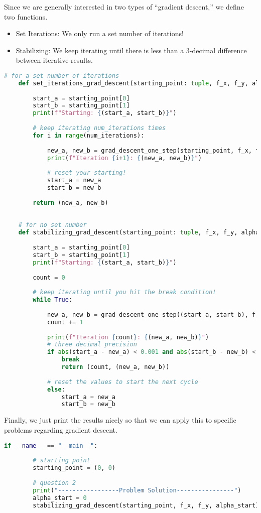 Since we are generally interested in two types of ``gradient descent,'' we define two functions. 
\begin{itemize}
    \item Set Iterations: We only run a set number of iterations!
    \item Stabilizing: We keep iterating until there is less than a $3$-decimal difference between iterative results.
\end{itemize}

\begin{lstlisting}[language=Python]
    # for a set number of iterations
    def set_iterations_grad_descent(starting_point: tuple, f_x, f_y, alpha: float, num_iterations: int):
    
        start_a = starting_point[0]
        start_b = starting_point[1]
        print(f"Starting: {(start_a, start_b)}")
    
        # keep iterating num_iterations times
        for i in range(num_iterations):
            
            new_a, new_b = grad_descent_one_step(starting_point, f_x, f_y, alpha)
            print(f"Iteration {i+1}: {(new_a, new_b)}")
    
            # reset your starting!
            start_a = new_a
            start_b = new_b
    
        return (new_a, new_b)
    
    
    # for no set number
    def stabilizing_grad_descent(starting_point: tuple, f_x, f_y, alpha: float):
    
        start_a = starting_point[0]
        start_b = starting_point[1]
        print(f"Starting: {(start_a, start_b)}")
    
        count = 0
    
        # keep iterating until you hit the break condition!
        while True:
    
            new_a, new_b = grad_descent_one_step((start_a, start_b), f_x, f_y, alpha)
            count += 1
    
            print(f"Iteration {count}: {(new_a, new_b)}")
            # three decimal precision
            if abs(start_a - new_a) < 0.001 and abs(start_b - new_b) < 0.001:
                break
                return (count, (new_a, new_b))
    
            # reset the values to start the next cycle
            else:
                start_a = new_a
                start_b = new_b
\end{lstlisting} 


Finally, we just print the results nicely so that we can apply this to specific problems regarding gradient descent. 

\begin{lstlisting}[language=Python]
    if __name__ == "__main__":
        
        # starting point
        starting_point = (0, 0)
    
        # question 2
        print("-----------------Problem Solution----------------")
        alpha_start = 0
        stabilizing_grad_descent(starting_point, f_x, f_y, alpha_start)

\end{lstlisting}